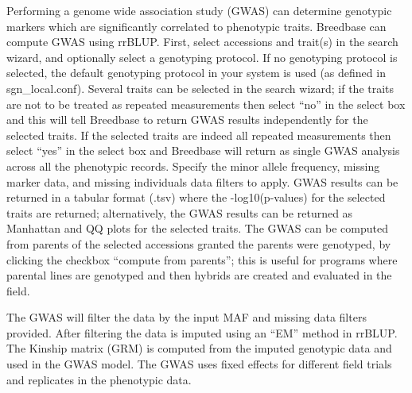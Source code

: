 \documentclass[
  12pt,
]{book}
\begin{document}
Performing a genome wide association study (GWAS) can determine genotypic markers which are significantly correlated to phenotypic traits. Breedbase can compute GWAS using rrBLUP. First, select accessions and trait(s) in the search wizard, and optionally select a genotyping protocol. If no genotyping protocol is selected, the default genotyping protocol in your system is used (as defined in sgn\_local.conf). Several traits can be selected in the search wizard; if the traits are not to be treated as repeated measurements then select ``no'' in the select box and this will tell Breedbase to return GWAS results independently for the selected traits. If the selected traits are indeed all repeated measurements then select ``yes'' in the select box and Breedbase will return as single GWAS analysis across all the phenotypic records. Specify the minor allele frequency, missing marker data, and missing individuals data filters to apply. GWAS results can be returned in a tabular format (.tsv) where the -log10(p-values) for the selected traits are returned; alternatively, the GWAS results can be returned as Manhattan and QQ plots for the selected traits. The GWAS can be computed from parents of the selected accessions granted the parents were genotyped, by clicking the checkbox ``compute from parents''; this is useful for programs where parental lines are genotyped and then hybrids are created and evaluated in the field.

The GWAS will filter the data by the input MAF and missing data filters provided. After filtering the data is imputed using an ``EM'' method in rrBLUP. The Kinship matrix (GRM) is computed from the imputed genotypic data and used in the GWAS model. The GWAS uses fixed effects for different field trials and replicates in the phenotypic data.
\end{document}
